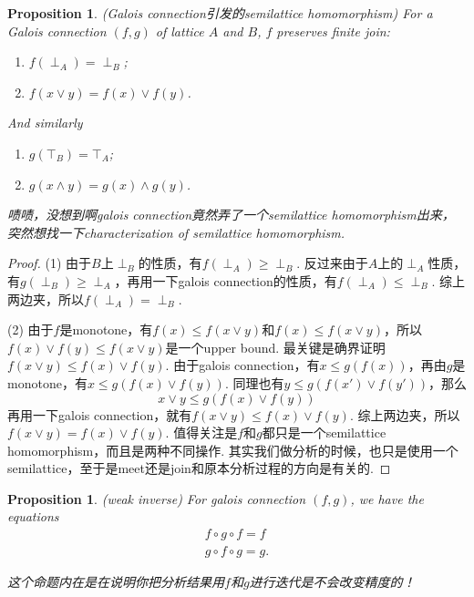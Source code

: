 \documentclass{article}
\newtheorem{proposition}[theorem]{Proposition}
\begin{document}
\newpage

\begin{proposition}
\rm {\color{red} (Galois connection引发的semilattice homomorphism)} For a Galois connection $(f,g)$ of lattice $A$ and $B$, $f$ preserves finite join:
\begin{enumerate}
	\item $f(\perp_A) = \perp_B$;
	\item $f(x \vee y) = f(x) \vee f(y)$.
\end{enumerate}
And similarly 
\begin{enumerate}
	\item $g(\top_B) = \top_A$;
	\item $g(x \wedge y) = g(x) \wedge g(y)$.
\end{enumerate}

{\color{blue} 啧啧，没想到啊galois connection竟然弄了一个semilattice homomorphism出来，突然想找一下characterization of semilattice homomorphism}. 
\end{proposition}

\begin{proof}
(1) 由于$B$上$\perp_B$的性质，有$f(\perp_A) \geq \perp_B$. 反过来由于$A$上的$\perp_A$性质，有$g(\perp_B) \geq \perp_A$，再用一下galois connection的性质，有$f(\perp_A) \leq \perp_B$. 综上两边夹，所以$f(\perp_A) = \perp_B$.

(2) 由于$f$是monotone，有$f(x) \leq f(x \vee y)$和$f(x) \leq f(x \vee y)$，所以$f(x) \vee f(y) \leq f(x \vee y)$是一个upper bound. 最关键是确界证明$f(x \vee y) \leq f(x) \vee f(y)$. 由于galois connection，有$x \leq g(f(x))$，再由$g$是monotone，有$x \leq g(f(x) \vee f(y))$. 同理也有$y \leq g(f(x') \vee f(y'))$，那么
$$
x \vee y \leq g(f(x) \vee f(y))
$$
再用一下galois connection，就有$f(x \vee y) \leq f(x) \vee f(y)$. 综上两边夹，所以$f(x \vee y) = f(x) \vee f(y)$. {\color{red} 值得关注是$f$和$g$都只是一个semilattice homomorphism，而且是两种不同操作}. 其实我们做分析的时候，也只是使用一个semilattice，至于是meet还是join和原本分析过程的方向是有关的. 
\end{proof}

\begin{proposition}
\rm {\color{red} (weak inverse)} For galois connection $(f,g)$, we have the equations
$$
\begin{aligned}
f \circ g \circ f  = f \\
g \circ f \circ g = g.
\end{aligned}
$$

{\color{blue} 这个命题内在是在说明你把分析结果用$f$和$g$进行迭代是不会改变精度的！}
\end{proposition}
\end{document}
